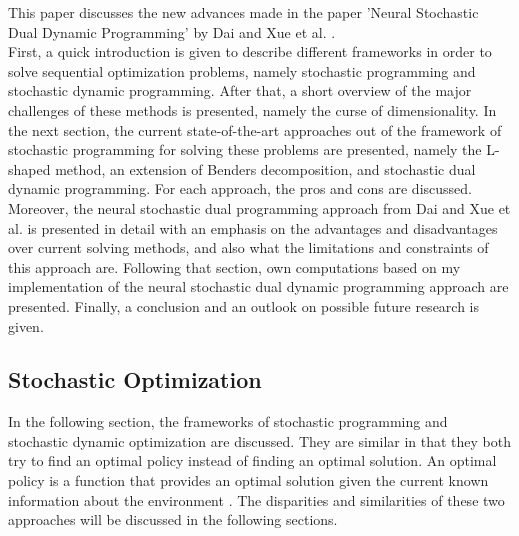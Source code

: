 This paper discusses the new advances made in the paper 'Neural Stochastic Dual Dynamic Programming' by Dai and Xue et al. \cite{NSDDP}.\\
First, a quick introduction is given to describe different frameworks in order to solve sequential optimization problems, namely stochastic programming and stochastic dynamic programming.
After that, a short overview of the major challenges of these methods is presented, namely the curse of dimensionality.
In the next section, the current state-of-the-art approaches out of the framework of stochastic programming for solving these problems are
presented, namely the L-shaped method, an extension of Benders decomposition, and stochastic dual dynamic programming.
For each approach, the pros and cons are discussed.
Moreover, the neural stochastic dual programming approach from Dai and Xue et al. \cite{NSDDP} is presented in detail with an emphasis on the advantages and disadvantages over current solving methods, and also what the limitations and constraints of this approach are.
Following that section, own computations based on my implementation of the neural stochastic dual dynamic programming approach are presented.
Finally, a conclusion and an outlook on possible future research is given.

\subsection{Stochastic Optimization}
In the following section, the frameworks of stochastic programming and stochastic dynamic optimization are discussed.
They are similar in that they both try to find an optimal policy instead of finding an optimal solution.
An optimal policy is a function that provides an optimal solution given the current known information about the environment \cite{POWELL2019795}. 
The disparities and similarities of these two approaches will be discussed in the following sections.


